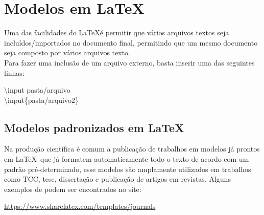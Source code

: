 \section{Modelos em \LaTeX}

\begin{frame}
    Uma das facilidades do \LaTeX é  permitir que vários arquivos textos seja incluídos/importados no documento final, permitindo que um mesmo documento seja composto por vários arquivos texto.\\
    Para fazer uma inclusão de um arquivo externo, basta inserir uma das seguintes linhas:

\vspace{1cm}
\begin{center}
    {\code \textbackslash input {pasta/arquivo}}\\
    {\code \textbackslash input\{pasta/arquivo2\}}
\end{center}

\end{frame}


\begin{frame}
\subsection*{Modelos padronizados em \LaTeX} %

Na produção científica é comum a publicação de trabalhos em modelos já  prontos em \LaTeX~que já formatem automaticamente todo o texto de acordo com um padrão pré-determinado, esse modelos são amplamente utilizados em trabalhos como TCC, tese, dissertação e publicação de artigos em revistas. Alguns exemplos de podem ser encontrados no site:

\begin{center}
\url{https://www.sharelatex.com/templates/journals}
\end{center}
\end{frame}


